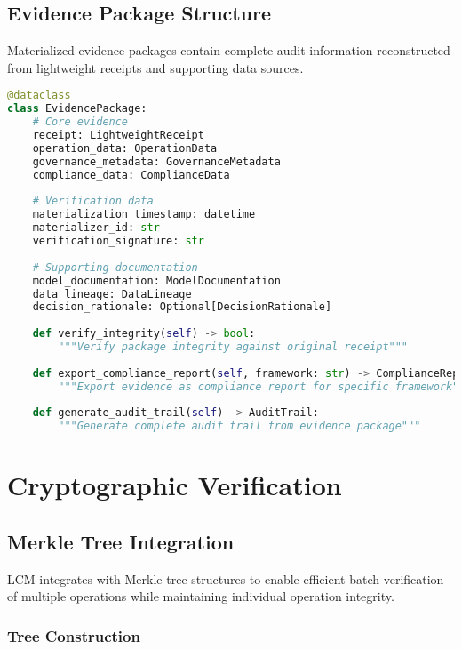 \documentclass[12pt,a4paper]{article}
\begin{document}
\subsection{Evidence Package Structure}

Materialized evidence packages contain complete audit information reconstructed from lightweight receipts and supporting data sources.

\begin{lstlisting}[language=Python, caption=Evidence Package Structure]
@dataclass
class EvidencePackage:
    # Core evidence
    receipt: LightweightReceipt
    operation_data: OperationData
    governance_metadata: GovernanceMetadata
    compliance_data: ComplianceData
    
    # Verification data
    materialization_timestamp: datetime
    materializer_id: str
    verification_signature: str
    
    # Supporting documentation
    model_documentation: ModelDocumentation
    data_lineage: DataLineage
    decision_rationale: Optional[DecisionRationale]
    
    def verify_integrity(self) -> bool:
        """Verify package integrity against original receipt"""
        
    def export_compliance_report(self, framework: str) -> ComplianceReport:
        """Export evidence as compliance report for specific framework"""
        
    def generate_audit_trail(self) -> AuditTrail:
        """Generate complete audit trail from evidence package"""
\end{lstlisting}

\section{Cryptographic Verification}

\subsection{Merkle Tree Integration}

LCM integrates with Merkle tree structures to enable efficient batch verification of multiple operations while maintaining individual operation integrity.

\subsubsection{Tree Construction}
\end{document}
